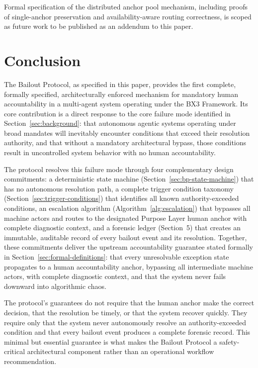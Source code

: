Formal specification of the distributed anchor pool mechanism, including proofs of single-anchor preservation and availability-aware routing correctness, is scoped as future work to be published as an addendum to this paper.

\section{Conclusion}
\label{sec:conclusion}

The Bailout Protocol, as specified in this paper, provides the first complete, formally specified, architecturally enforced mechanism for mandatory human accountability in a multi-agent system operating under the BX3 Framework. Its core contribution is a direct response to the core failure mode identified in Section~\ref{sec:background}: that autonomous agentic systems operating under broad mandates will inevitably encounter conditions that exceed their resolution authority, and that without a mandatory architectural bypass, those conditions result in uncontrolled system behavior with no human accountability.

The protocol resolves this failure mode through four complementary design commitments: a deterministic state machine (Section~\ref{sec:bp-state-machine}) that has no autonomous resolution path, a complete trigger condition taxonomy (Section~\ref{sec:trigger-conditions}) that identifies all known authority-exceeded conditions, an escalation algorithm (Algorithm~\ref{alg:escalation}) that bypasses all machine actors and routes to the designated Purpose Layer human anchor with complete diagnostic context, and a forensic ledger (Section~5) that creates an immutable, auditable record of every bailout event and its resolution. Together, these commitments deliver the upstream accountability guarantee stated formally in Section~\ref{sec:formal-definitions}: that every unresolvable exception state propagates to a human accountability anchor, bypassing all intermediate machine actors, with complete diagnostic context, and that the system never fails downward into algorithmic chaos.

The protocol's guarantees do not require that the human anchor make the correct decision, that the resolution be timely, or that the system recover quickly. They require only that the system never autonomously resolve an authority-exceeded condition and that every bailout event produces a complete forensic record. This minimal but essential guarantee is what makes the Bailout Protocol a safety-critical architectural component rather than an operational workflow recommendation.

